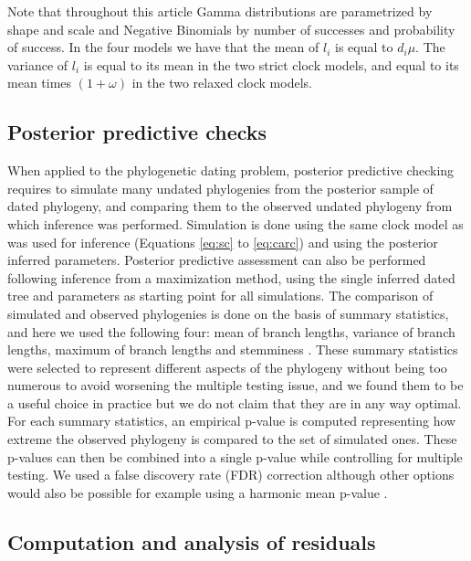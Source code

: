 \documentclass{article}
\begin{document}
Note that throughout this article Gamma distributions are parametrized by shape and scale and Negative Binomials 
by number of successes and probability of success. In the four models we have that the mean of $l_i$ is equal to
$d_i \mu$. The variance of $l_i$ is equal to its mean in the two strict clock models, and equal to its mean 
times $(1+\omega)$ in the two relaxed clock models.

\subsection*{Posterior predictive checks}

When applied to the phylogenetic dating problem, posterior predictive checking requires
to simulate many undated phylogenies from the posterior sample of dated phylogeny,
and comparing them to the observed undated phylogeny from which inference was performed.
Simulation is done using the same clock model as was used for inference (Equations \ref{eq:sc} to \ref{eq:carc})
and using the posterior inferred parameters. Posterior predictive assessment can also be performed
following inference from a maximization method, using the single inferred dated tree and parameters as 
starting point for all simulations. 
The comparison of simulated and observed phylogenies is done on the basis of summary statistics, and
here we used the following four: mean of branch lengths, variance of branch lengths,
maximum of branch lengths and stemminess \citep{fialaFactorsDeterminingAccuracy1985}. 
These summary statistics were selected to represent different aspects of the phylogeny without
being too numerous to avoid worsening the multiple testing issue, and we found them to be a useful
choice in practice but we do not claim that they are in any way optimal.
For each summary statistics, an empirical p-value is computed representing how extreme the 
observed phylogeny is compared to the set of simulated ones. 
These p-values can then be combined into a single p-value while controlling for multiple testing.
We used a false discovery rate (FDR) correction \citep{Benjamini1995} although other options would also be 
possible for example using a harmonic mean p-value \citep{wilsonHarmonicMeanPvalue2019}.

\subsection*{Computation and analysis of residuals}
\end{document}
